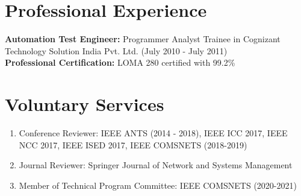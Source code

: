 \documentclass{article}
\begin{document}
\section{Professional Experience}
	{\bf Automation Test Engineer:} Programmer Analyst Trainee in Cognizant Technology Solution India Pvt. Ltd. (July 2010 - July 2011)\\[3ex]
	{\bf Professional Certification:} LOMA 280 certified with 99.2\%         
\section{Voluntary Services}
  \begin{enumerate}
   \item Conference Reviewer: IEEE ANTS (2014 - 2018), IEEE ICC 2017, IEEE NCC 2017, IEEE ISED 2017, IEEE COMSNETS (2018-2019)
   \item Journal Reviewer: Springer Journal of Network and Systems Management
   \item Member of Technical Program Committee: IEEE  COMSNETS (2020-2021)
  \end{enumerate}

   \nocite{*}
  
  
\end{document}
